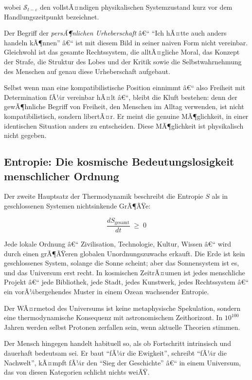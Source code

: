 ﻿\documentclass[12pt, a4paper]{article}
\begin{document}
wobei $\mathcal{S}_{t-\varepsilon}$ den vollstÃ¤ndigen physikalischen Systemzustand
kurz vor dem Handlungszeitpunkt bezeichnet.

Der Begriff der \emph{persÃ¶nlichen Urheberschaft} â€“ \enquote{Ich hÃ¤tte auch anders
handeln kÃ¶nnen} â€“ ist mit diesem Bild in seiner naiven Form nicht vereinbar.
Gleichwohl ist das gesamte Rechtssystem, die alltÃ¤gliche Moral, das Konzept der
Strafe, die Struktur des Lobes und der Kritik sowie die Selbstwahrnehmung des
Menschen auf genau diese Urheberschaft aufgebaut.

Selbst wenn man eine kompatibilistische Position einnimmt â€“ also Freiheit mit
Determination fÃ¼r vereinbar hÃ¤lt â€“, bleibt die Kluft bestehen: denn der gewÃ¶hnliche
Begriff von Freiheit, den Menschen im Alltag verwenden, ist nicht kompatibilistisch,
sondern libertÃ¤r. Er meint die genuine MÃ¶glichkeit, in einer identischen Situation
anders zu entscheiden. Diese MÃ¶glichkeit ist physikalisch nicht gegeben.

\subsection{Entropie: Die kosmische Bedeutungslosigkeit menschlicher Ordnung}

Der zweite Hauptsatz der Thermodynamik beschreibt die Entropie $S$ als in
geschlossenen Systemen nichtsinkende GrÃ¶ÃŸe:

\begin{equation}
  \frac{dS_{\text{gesamt}}}{dt} \;\geq\; 0
\end{equation}

Jede lokale Ordnung â€“ Zivilisation, Technologie, Kultur, Wissen â€“
wird durch einen grÃ¶ÃŸeren globalen Unordnungszuwachs erkauft. Die Erde ist kein
geschlossenes System, solange die Sonne scheint; aber das Sonnensystem ist es, und
das Universum erst recht. In kosmischen ZeitrÃ¤umen ist jedes menschliche Projekt â€“
jede Bibliothek, jede Stadt, jedes Kunstwerk, jedes Rechtssystem â€“
ein vorÃ¼bergehendes Muster in einem Ozean wachsender Entropie.

Der WÃ¤rmetod des Universums ist keine metaphysische Spekulation, sondern eine
thermodynamische Konsequenz mit astronomischem Zeithorizont. In
$10^{100}$ Jahren werden selbst Protonen zerfallen sein, wenn aktuelle
Theorien stimmen.

Der Mensch hingegen handelt habituell so, als ob Fortschritt intrinsisch und
dauerhaft bedeutsam sei. Er baut \enquote{fÃ¼r die Ewigkeit}, schreibt
\enquote{fÃ¼r die Nachwelt}, kÃ¤mpft fÃ¼r den \enquote{Sieg der Geschichte} â€“
in einem Universum, das von diesen Kategorien schlicht nichts weiÃŸ.
\end{document}
